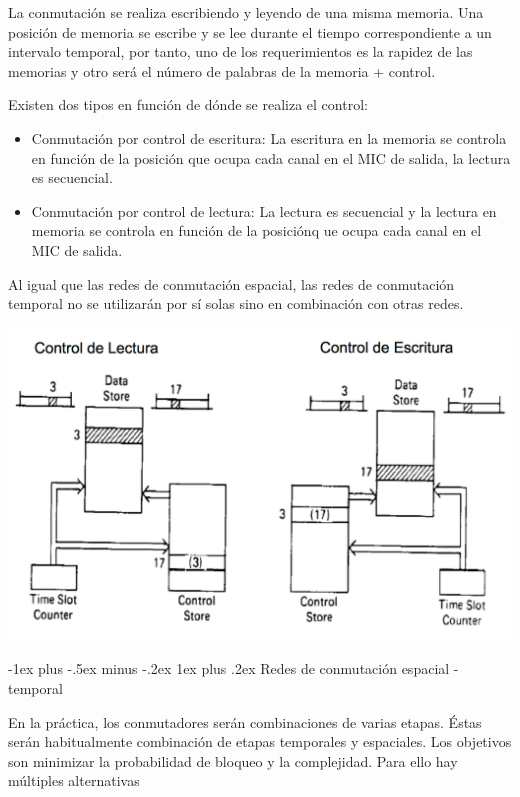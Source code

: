 \documentclass[10pt,portrait, twocolumn]{article}
\makeatletter
\renewcommand{\subsubsection}{\@startsection{subsubsection}{3}{0mm}%
                                {-1ex plus -.5ex minus -.2ex}%
                                {1ex plus .2ex}%
                                {\normalfont\small\bfseries}}
\makeatother
\begin{document}
La conmutación se realiza escribiendo y leyendo de una misma memoria. Una posición de memoria se escribe y se lee durante el tiempo correspondiente a un intervalo temporal, por tanto, uno de los requerimientos es la rapidez de las memorias y otro será el número de palabras de la memoria + control.

Existen dos tipos en función de dónde se realiza el control:

	\begin{itemize}
		\item Conmutación por control de escritura: La escritura en la memoria se controla en función de la posición que ocupa cada canal en el MIC de salida, la lectura es secuencial.
		\item Conmutación por control de lectura: La lectura es secuencial y la lectura en memoria se controla en función de la posiciónq ue ocupa cada canal en el MIC de salida.
	\end{itemize}
	
Al igual que las redes de conmutación espacial, las redes de conmutación temporal no se utilizarán por sí solas sino en combinación con otras redes.

	\begin{center}
		\includegraphics[scale = 0.3]{temporal2}
	\end{center}
	
\subsubsection{Redes de conmutación espacial - temporal}

En la práctica, los conmutadores serán combinaciones de varias etapas. Éstas serán habitualmente combinación de etapas temporales y espaciales. Los objetivos son minimizar la probabilidad de bloqueo y la complejidad. Para ello hay múltiples alternativas
	




\end{document}
